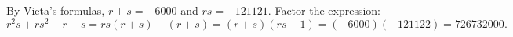 By Vieta's formulas, $r+s=-6000$ and $rs=-121121$. Factor the expression:
\[
r^2s+rs^2-r-s=rs(r+s)-(r+s)=(r+s)(rs-1)=(-6000)(-121122)=\boxed{726732000}.
\]
